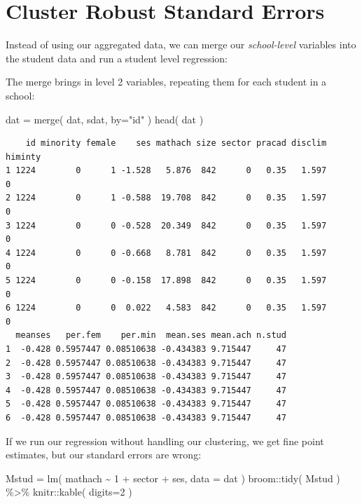 \documentclass[
  letterpaper,
  DIV=11,
  numbers=noendperiod]{scrreprt}
\newenvironment{Shaded}{}{}
\newcommand{\AttributeTok}[1]{\textcolor[rgb]{0.49,0.56,0.16}{#1}}
\newcommand{\DecValTok}[1]{\textcolor[rgb]{0.25,0.63,0.44}{#1}}
\newcommand{\FunctionTok}[1]{\textcolor[rgb]{0.02,0.16,0.49}{#1}}
\newcommand{\NormalTok}[1]{#1}
\newcommand{\OtherTok}[1]{\textcolor[rgb]{0.00,0.44,0.13}{#1}}
\newcommand{\SpecialCharTok}[1]{\textcolor[rgb]{0.25,0.44,0.63}{#1}}
\newcommand{\StringTok}[1]{\textcolor[rgb]{0.25,0.44,0.63}{#1}}
\begin{document}
\section{Cluster Robust Standard
Errors}\label{cluster-robust-standard-errors}

Instead of using our aggregated data, we can merge our
\emph{school-level} variables into the student data and run a student
level regression:

The merge brings in level 2 variables, repeating them for each student
in a school:

\begin{Shaded}
\begin{Highlighting}[]
\NormalTok{dat }\OtherTok{=} \FunctionTok{merge}\NormalTok{( dat, sdat, }\AttributeTok{by=}\StringTok{"id"}\NormalTok{ )}
\FunctionTok{head}\NormalTok{( dat )}
\end{Highlighting}
\end{Shaded}

\begin{verbatim}
    id minority female    ses mathach size sector pracad disclim himinty
1 1224        0      1 -1.528   5.876  842      0   0.35   1.597       0
2 1224        0      1 -0.588  19.708  842      0   0.35   1.597       0
3 1224        0      0 -0.528  20.349  842      0   0.35   1.597       0
4 1224        0      0 -0.668   8.781  842      0   0.35   1.597       0
5 1224        0      0 -0.158  17.898  842      0   0.35   1.597       0
6 1224        0      0  0.022   4.583  842      0   0.35   1.597       0
  meanses   per.fem    per.min  mean.ses mean.ach n.stud
1  -0.428 0.5957447 0.08510638 -0.434383 9.715447     47
2  -0.428 0.5957447 0.08510638 -0.434383 9.715447     47
3  -0.428 0.5957447 0.08510638 -0.434383 9.715447     47
4  -0.428 0.5957447 0.08510638 -0.434383 9.715447     47
5  -0.428 0.5957447 0.08510638 -0.434383 9.715447     47
6  -0.428 0.5957447 0.08510638 -0.434383 9.715447     47
\end{verbatim}

If we run our regression without handling our clustering, we get fine
point estimates, but our standard errors are wrong:

\begin{Shaded}
\begin{Highlighting}[]
\NormalTok{Mstud }\OtherTok{=} \FunctionTok{lm}\NormalTok{( mathach }\SpecialCharTok{\textasciitilde{}} \DecValTok{1} \SpecialCharTok{+}\NormalTok{ sector }\SpecialCharTok{+}\NormalTok{ ses, }\AttributeTok{data =}\NormalTok{ dat )}
\NormalTok{broom}\SpecialCharTok{::}\FunctionTok{tidy}\NormalTok{( Mstud ) }\SpecialCharTok{\%\textgreater{}\%} 
\NormalTok{  knitr}\SpecialCharTok{::}\FunctionTok{kable}\NormalTok{( }\AttributeTok{digits=}\DecValTok{2}\NormalTok{ )}
\end{Highlighting}
\end{Shaded}
\end{document}
